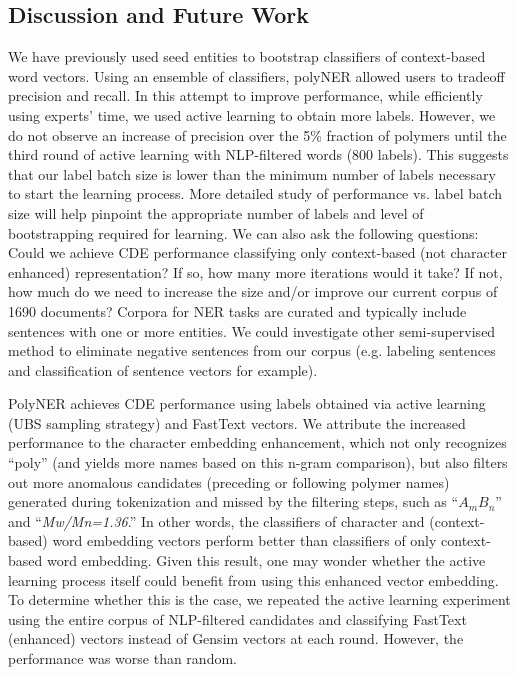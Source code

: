 \subsection{Discussion and Future Work}
\label{sec:discussion}
We have previously used seed entities to bootstrap classifiers of context-based word vectors. 
Using an ensemble of classifiers, polyNER allowed users to tradeoff precision and recall.
In this attempt to improve performance, while efficiently using experts' time, we used active learning to obtain more labels. %
However, we do not observe an increase of precision over the 5\% fraction of polymers until the third round of active learning with NLP-filtered words (800 labels). 
This suggests that our label batch size is lower than the minimum number of labels necessary to start the learning process.
More detailed study of performance vs. label batch size will help pinpoint the appropriate number of labels and level of bootstrapping required for learning.
We can also ask the following questions: Could we achieve CDE performance classifying only context-based (not character enhanced) representation? If so, how many more iterations would it take? If not, how much do we need to increase the size and/or improve our current corpus of \num{1690} documents?
Corpora for NER tasks are curated and typically include sentences with one or more entities.
We could investigate other semi-supervised method to eliminate negative sentences from our corpus (e.g. labeling sentences and classification of sentence vectors for example).

PolyNER achieves CDE performance using labels obtained via active learning (UBS sampling strategy) and FastText vectors.
We attribute the increased performance to the character embedding enhancement, which not only recognizes ``poly'' (and yields more names based on this n-gram comparison), 
but also filters out more anomalous candidates (preceding or following polymer names) generated during tokenization and missed by the filtering steps, 
such as ``\textit{$A_mB_n$}'' and ``\textit{Mw/Mn=1.36}.'' 
In other words, the classifiers of character and (context-based) word embedding vectors perform better than classifiers of only context-based word embedding.
Given this result, one may wonder whether the active learning process itself could benefit from using this enhanced vector embedding. 
To determine whether this is the case,
we repeated the active learning experiment using the entire corpus of NLP-filtered candidates and classifying FastText (enhanced) vectors instead of Gensim vectors at each round. 
However, the performance was worse than random.

